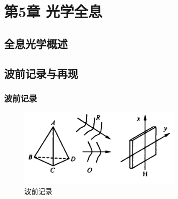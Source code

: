 \documentclass[UTF8]{ctexart}
\begin{document}
\section{第5章 光学全息}
\subsection{全息光学概述}
\subsection{波前记录与再现}
\subsubsection{波前记录}
\begin{figure}[htbp]
    \centering
    \includegraphics[width=0.7\textwidth]{1.PNG}
    \caption{波前记录}
    \label{1}
\end{figure}
\end{document}
